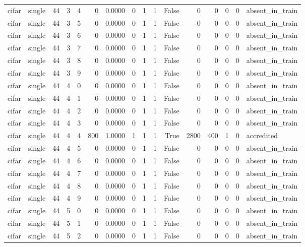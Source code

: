 \begin{tabular}{llrrrrrrrrrrrrrl}
cifar & single & 44 & 3 & 4 & 0 & 0.0000 & 0 & 1 & 1 & False & 0 & 0 & 0 & 0 & absent\_in\_train \\
cifar & single & 44 & 3 & 5 & 0 & 0.0000 & 0 & 1 & 1 & False & 0 & 0 & 0 & 0 & absent\_in\_train \\
cifar & single & 44 & 3 & 6 & 0 & 0.0000 & 0 & 1 & 1 & False & 0 & 0 & 0 & 0 & absent\_in\_train \\
cifar & single & 44 & 3 & 7 & 0 & 0.0000 & 0 & 1 & 1 & False & 0 & 0 & 0 & 0 & absent\_in\_train \\
cifar & single & 44 & 3 & 8 & 0 & 0.0000 & 0 & 1 & 1 & False & 0 & 0 & 0 & 0 & absent\_in\_train \\
cifar & single & 44 & 3 & 9 & 0 & 0.0000 & 0 & 1 & 1 & False & 0 & 0 & 0 & 0 & absent\_in\_train \\
cifar & single & 44 & 4 & 0 & 0 & 0.0000 & 0 & 1 & 1 & False & 0 & 0 & 0 & 0 & absent\_in\_train \\
cifar & single & 44 & 4 & 1 & 0 & 0.0000 & 0 & 1 & 1 & False & 0 & 0 & 0 & 0 & absent\_in\_train \\
cifar & single & 44 & 4 & 2 & 0 & 0.0000 & 0 & 1 & 1 & False & 0 & 0 & 0 & 0 & absent\_in\_train \\
cifar & single & 44 & 4 & 3 & 0 & 0.0000 & 0 & 1 & 1 & False & 0 & 0 & 0 & 0 & absent\_in\_train \\
cifar & single & 44 & 4 & 4 & 800 & 1.0000 & 1 & 1 & 1 & True & 2800 & 400 & 1 & 0 & accredited \\
cifar & single & 44 & 4 & 5 & 0 & 0.0000 & 0 & 1 & 1 & False & 0 & 0 & 0 & 0 & absent\_in\_train \\
cifar & single & 44 & 4 & 6 & 0 & 0.0000 & 0 & 1 & 1 & False & 0 & 0 & 0 & 0 & absent\_in\_train \\
cifar & single & 44 & 4 & 7 & 0 & 0.0000 & 0 & 1 & 1 & False & 0 & 0 & 0 & 0 & absent\_in\_train \\
cifar & single & 44 & 4 & 8 & 0 & 0.0000 & 0 & 1 & 1 & False & 0 & 0 & 0 & 0 & absent\_in\_train \\
cifar & single & 44 & 4 & 9 & 0 & 0.0000 & 0 & 1 & 1 & False & 0 & 0 & 0 & 0 & absent\_in\_train \\
cifar & single & 44 & 5 & 0 & 0 & 0.0000 & 0 & 1 & 1 & False & 0 & 0 & 0 & 0 & absent\_in\_train \\
cifar & single & 44 & 5 & 1 & 0 & 0.0000 & 0 & 1 & 1 & False & 0 & 0 & 0 & 0 & absent\_in\_train \\
cifar & single & 44 & 5 & 2 & 0 & 0.0000 & 0 & 1 & 1 & False & 0 & 0 & 0 & 0 & absent\_in\_train \\

\end{tabular}
